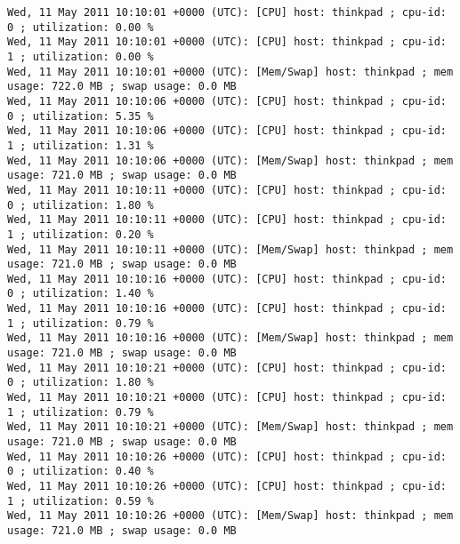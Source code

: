 \begin{compactenum}
\setBashListing
\begin{lstlisting}
Wed, 11 May 2011 10:10:01 +0000 (UTC): [CPU] host: thinkpad ; cpu-id: 0 ; utilization: 0.00 %
Wed, 11 May 2011 10:10:01 +0000 (UTC): [CPU] host: thinkpad ; cpu-id: 1 ; utilization: 0.00 %
Wed, 11 May 2011 10:10:01 +0000 (UTC): [Mem/Swap] host: thinkpad ; mem usage: 722.0 MB ; swap usage: 0.0 MB
Wed, 11 May 2011 10:10:06 +0000 (UTC): [CPU] host: thinkpad ; cpu-id: 0 ; utilization: 5.35 %
Wed, 11 May 2011 10:10:06 +0000 (UTC): [CPU] host: thinkpad ; cpu-id: 1 ; utilization: 1.31 %
Wed, 11 May 2011 10:10:06 +0000 (UTC): [Mem/Swap] host: thinkpad ; mem usage: 721.0 MB ; swap usage: 0.0 MB
Wed, 11 May 2011 10:10:11 +0000 (UTC): [CPU] host: thinkpad ; cpu-id: 0 ; utilization: 1.80 %
Wed, 11 May 2011 10:10:11 +0000 (UTC): [CPU] host: thinkpad ; cpu-id: 1 ; utilization: 0.20 %
Wed, 11 May 2011 10:10:11 +0000 (UTC): [Mem/Swap] host: thinkpad ; mem usage: 721.0 MB ; swap usage: 0.0 MB
Wed, 11 May 2011 10:10:16 +0000 (UTC): [CPU] host: thinkpad ; cpu-id: 0 ; utilization: 1.40 %
Wed, 11 May 2011 10:10:16 +0000 (UTC): [CPU] host: thinkpad ; cpu-id: 1 ; utilization: 0.79 %
Wed, 11 May 2011 10:10:16 +0000 (UTC): [Mem/Swap] host: thinkpad ; mem usage: 721.0 MB ; swap usage: 0.0 MB
Wed, 11 May 2011 10:10:21 +0000 (UTC): [CPU] host: thinkpad ; cpu-id: 0 ; utilization: 1.80 %
Wed, 11 May 2011 10:10:21 +0000 (UTC): [CPU] host: thinkpad ; cpu-id: 1 ; utilization: 0.79 %
Wed, 11 May 2011 10:10:21 +0000 (UTC): [Mem/Swap] host: thinkpad ; mem usage: 721.0 MB ; swap usage: 0.0 MB
Wed, 11 May 2011 10:10:26 +0000 (UTC): [CPU] host: thinkpad ; cpu-id: 0 ; utilization: 0.40 %
Wed, 11 May 2011 10:10:26 +0000 (UTC): [CPU] host: thinkpad ; cpu-id: 1 ; utilization: 0.59 %
Wed, 11 May 2011 10:10:26 +0000 (UTC): [Mem/Swap] host: thinkpad ; mem usage: 721.0 MB ; swap usage: 0.0 MB
\end{lstlisting}


\end{compactenum}

